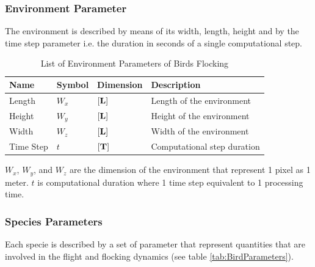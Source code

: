 \subsubsection{Environment Parameter}
The environment is described by means of its width, length, height and by the
time step parameter i.e. the duration in seconds of a single computational
step. 
\begin{table}[h!]
	\centering
	\begin{tabular}{l l l l}
		\hline
		Name & Symbol & Dimension & Description\\
		\hline
		Length &  \(W_x\) & $\left[\vb{L}\right]$ & Length of the environment \\
		Height & \(W_y\) & $\left[\vb{L}\right]$ & Height of the environment \\
		Width & \(W_z\) & $\left[\vb{L}\right]$ & Width of the environment \\
		Time Step & \(t\) & $\left[\vb{T}\right]$ & Computational step duration \\
		\hline
	\end{tabular}
	\caption[List of Environment Parameters]{List of Environment Parameters of Birds Flocking}
	\label{tab:EnvironmentParameters}
\end{table}

\(W_x\), \(W_y\), and \(W_z\) are the dimension of the environment that represent 1 pixel as 1 meter. \(t\) is computational duration where 1 time step equivalent to 1 processing time.

\subsubsection{Species Parameters}
Each specie is described by a set of parameter that represent quantities that
are involved in the flight and flocking dynamics (see table \ref{tab:BirdParameters}).

